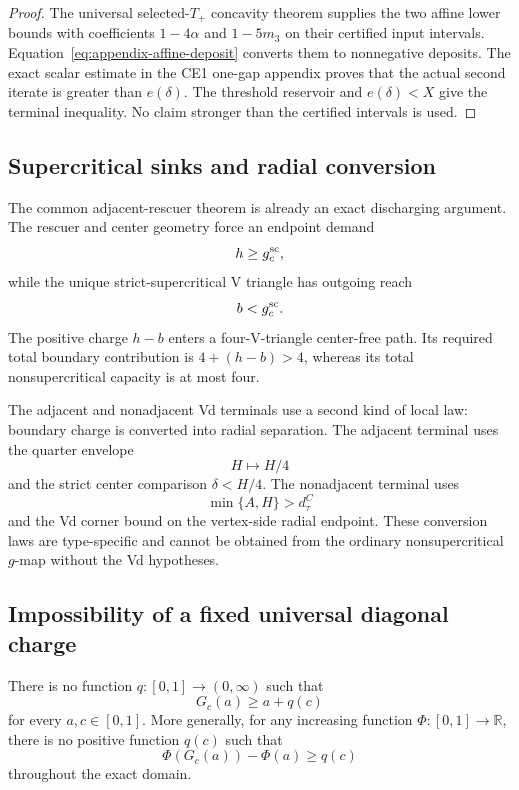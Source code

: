 \begin{proof}
The universal selected-\(T_+\) concavity theorem supplies the two affine lower
bounds with coefficients \(1-4\alpha\) and \(1-5m_3\) on their certified
input intervals.  Equation~\eqref{eq:appendix-affine-deposit} converts them to
nonnegative deposits.  The exact scalar estimate in the CE1 one-gap appendix
proves that the actual second iterate is greater than \(e(\delta)\).  The
threshold reservoir and \(e(\delta)<X\) give the terminal inequality.  No
claim stronger than the certified intervals is used.
\end{proof}

\subsection{Supercritical sinks and radial conversion}

The common adjacent-rescuer theorem is already an exact discharging argument.
The rescuer and center geometry force an endpoint demand
\[
 h\ge g_c^{\rm sc},
\]
while the unique strict-supercritical V triangle has outgoing reach
\[
 b<g_c^{\rm sc}.
\]
The positive charge \(h-b\) enters a four-V-triangle center-free path.  Its
required total boundary contribution is \(4+(h-b)>4\), whereas its total
nonsupercritical capacity is at most four.

The adjacent and nonadjacent Vd terminals use a second kind of local law:
boundary charge is converted into radial separation.  The adjacent terminal
uses the quarter envelope
\[
 H\longmapsto H/4
\]
and the strict center comparison \(\delta<H/4\).  The nonadjacent terminal
uses
\[
 \min\{A,H\}>d_\tau^C
\]
and the Vd corner bound on the vertex-side radial endpoint.  These conversion
laws are type-specific and cannot be obtained from the ordinary
nonsupercritical \(g\)-map without the Vd hypotheses.

\subsection{Impossibility of a fixed universal diagonal charge}

\begin{proposition}
\label{prop:appendix-no-fixed-charge}
There is no function \(q:[0,1]\to(0,\infty)\) such that
\[
 G_c(a)\ge a+q(c)
\]
for every \(a,c\in[0,1]\).  More generally, for any increasing function
\(\Phi:[0,1]\to\mathbb R\), there is no positive function \(q(c)\) such that
\[
 \Phi(G_c(a))-\Phi(a)\ge q(c)
\]
throughout the exact domain.
\end{proposition}

